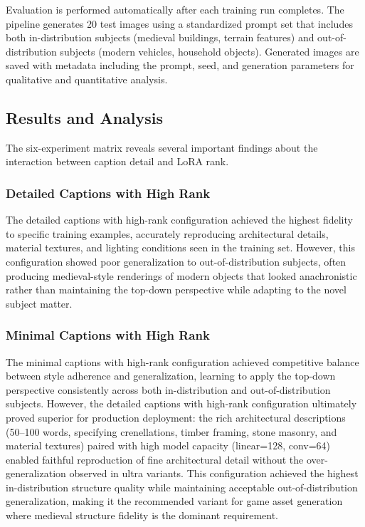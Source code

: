 \documentclass[conference]{IEEEtran}
\begin{document}
Evaluation is performed automatically after each training run completes. The pipeline generates 20 test images using a standardized prompt set that includes both in-distribution subjects (medieval buildings, terrain features) and out-of-distribution subjects (modern vehicles, household objects). Generated images are saved with metadata including the prompt, seed, and generation parameters for qualitative and quantitative analysis.

\subsection{Results and Analysis}

The six-experiment matrix reveals several important findings about the interaction between caption detail and LoRA rank.

\subsubsection{Detailed Captions with High Rank}

The detailed captions with high-rank configuration achieved the highest fidelity to specific training examples, accurately reproducing architectural details, material textures, and lighting conditions seen in the training set. However, this configuration showed poor generalization to out-of-distribution subjects, often producing medieval-style renderings of modern objects that looked anachronistic rather than maintaining the top-down perspective while adapting to the novel subject matter.

\subsubsection{Minimal Captions with High Rank}

The minimal captions with high-rank configuration achieved competitive balance between style adherence and generalization, learning to apply the top-down perspective consistently across both in-distribution and out-of-distribution subjects. However, the detailed captions with high-rank configuration ultimately proved superior for production deployment: the rich architectural descriptions (50--100 words, specifying crenellations, timber framing, stone masonry, and material textures) paired with high model capacity (linear=128, conv=64) enabled faithful reproduction of fine architectural detail without the over-generalization observed in ultra variants. This configuration achieved the highest in-distribution structure quality while maintaining acceptable out-of-distribution generalization, making it the recommended variant for game asset generation where medieval structure fidelity is the dominant requirement.
\end{document}
